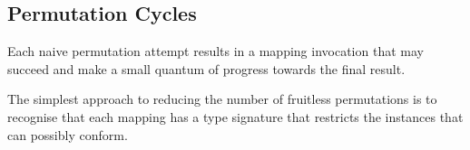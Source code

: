 \documentclass{jot}
\begin{document}



\subsection{Permutation Cycles}

Each naive permutation attempt results in a mapping invocation that may succeed and make a small quantum of progress towards the final result.

The simplest approach to reducing the number of fruitless permutations is to recognise that each mapping has a type signature that restricts the instances that can possibly conform.
\end{document}
